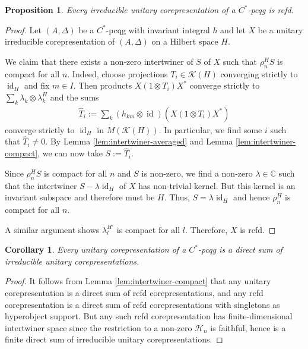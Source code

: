 \documentclass[11pt]{article}
\DeclareMathOperator{\id}{id}
\newcommand{\C}{\mathbb{C}}
\newcommand{\Hsp}{\mathcal{H}}
\newtheorem{Prop}[Theorem]{Proposition}
\newtheorem{Cor}[Theorem]{Corollary}
\theoremstyle{definition}
\numberwithin{equation}{section}
\begin{document}
\begin{Prop} \label{prop:corep-rcfd}
Every irreducible unitary corepresentation of a  $C^{*}$-pcqg is rcfd.
\end{Prop}
\begin{proof}
  Let $(A,\Delta)$ be a $C^{*}$-pcqg with invariant integral $h$ and
  let $X$ be a unitary irreducible corepresentation of $(A,\Delta)$ on
  a Hilbert space $H$.

  We claim that there exists a non-zero intertwiner of $S$ of $X$ such
  that $\rho^{H}_{n}S$ is compact for all $n$.  Indeed, choose
  projections $T_{i} \in \mathcal{K}(H)$ converging strictly to
  $\id_{H}$ and fix $m\in I$. Then products $X(1\otimes T_{i})X^{*}$
  converge strictly to $\sum_{k} \lambda_{k} \otimes \lambda_{k}^{H}$
  and the sums
  \begin{align*}
    \hat T_{i} := \sum_{k}(h_{km} \otimes \id)(X(1\otimes T_{i})X^{*})
  \end{align*}
  converge strictly to $\id_{H}$ in $M(\mathcal{K}(H))$. In
  particular, we find some $i$ such that $\hat T_{i}\neq 0$.  By Lemma 
  \ref{lem:intertwiner-averaged} and  Lemma
  \ref{lem:intertwiner-compact}, we can now take $S:=\hat T_{i}$.

  Since $\rho^{H}_{n}S$ is compact for all $n$ and $S$ is non-zero, we
  find a non-zero $\lambda\in \C$ such that the
  intertwiner $S-\lambda\id_{H}$ of $X$ has non-trivial kernel.  But
  this kernel is an invariant subspace and therefore must be $H$.
  Thus, $S=\lambda\id_{H}$ and hence $\rho^{H}_{n}$ is compact for all
  $n$.

  A similar argument shows $\lambda^{H'}_{l}$ is compact for all
  $l$. Therefore, $X$ is rcfd.
\end{proof}

\begin{Cor} \label{cor:corep-decompose}
  Every unitary corepresentation of a $C^{*}$-pcqg is a direct sum of
 irreducible unitary corepresentations.
\end{Cor}
\begin{proof} It follows from Lemma \ref{lem:intertwiner-compact} that any unitary corepresentation is a direct sum of rcfd corepresentations, and any rcfd corepresentation is a direct sum of rcfd corepresentations with singletons as hyperobject support. But any such rcfd corepresentation has finite-dimensional intertwiner space since the restriction to a non-zero $\Hsp_n$ is faithful, hence is a finite direct sum of irreducible unitary corepresentations. 
\end{proof} 
\end{document}
